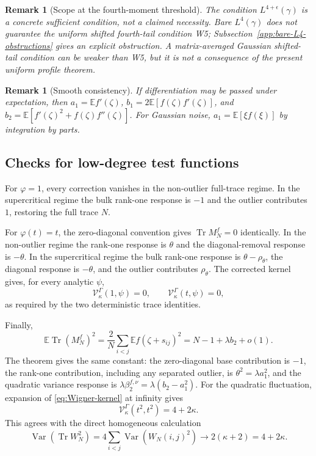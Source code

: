 \documentclass[10pt,a4paper]{amsart}
\newtheorem{remark}[theorem]{Remark}
\newcommand{\E}{\mathbb E}
\newcommand{\Var}{\operatorname{Var}}
\newcommand{\Tr}{\operatorname{Tr}}
\begin{document}
\begin{remark}[Scope at the fourth-moment threshold]
The condition $L^{4+\epsilon}(\gamma)$ is a concrete sufficient condition,
not a claimed necessity.  Bare $L^4(\gamma)$ does not guarantee the uniform
shifted fourth-tail condition W5; Subsection~\ref{app:bare-L4-obstructions}
gives an explicit obstruction.  A matrix-averaged Gaussian shifted-tail
condition can be weaker than W5, but it is not a consequence of the present
uniform profile theorem.
\end{remark}

\begin{remark}[Smooth consistency]
If differentiation may be passed under expectation, then
$a_1=\E f'(\zeta)$,
$b_1=2\E[f(\zeta)f'(\zeta)]$, and
$b_2=\E[f'(\zeta)^2+f(\zeta)f''(\zeta)]$.  For Gaussian noise,
$a_1=\E[\xi f(\xi)]$ by integration by parts.
\end{remark}
\subsection{Checks for low-degree test functions}

For $\varphi=1$, every correction vanishes in the non-outlier full-trace
regime.  In the supercritical regime the bulk rank-one response is $-1$ and
the outlier contributes $1$, restoring the full trace $N$.

For $\varphi(t)=t$, the zero-diagonal convention gives
$\Tr M_N^f=0$ identically.  In the non-outlier regime the rank-one response is
$\theta$ and the diagonal-removal response is $-\theta$.  In the
supercritical regime the bulk rank-one response is $\theta-\rho_\theta$, the
diagonal response is $-\theta$, and the outlier contributes $\rho_\theta$.
The corrected kernel gives, for every analytic \(\psi\),
\begin{equation}\label{eq:linear-covariance-check}
 \mathcal V_\kappa^\Gamma(1,\psi)=0,
 \qquad
 \mathcal V_\kappa^\Gamma(t,\psi)=0,
\end{equation}
as required by the two deterministic trace identities.

Finally,
\[
 \E\Tr(M_N^f)^2
 =\frac2N\sum_{i<j}\E f(\zeta+s_{ij})^2
 =N-1+\lambda b_2+o(1).
\]
The theorem gives the same constant: the zero-diagonal base contribution is
$-1$, the rank-one contribution, including any separated outlier, is
$\theta^2=\lambda a_1^2$, and the quadratic variance response is
$\lambda\beta_2^{f,\nu}=\lambda(b_2-a_1^2)$.
For the quadratic fluctuation, expansion of \eqref{eq:Wigner-kernel} at
infinity gives
\begin{equation}\label{eq:quadratic-covariance-check}
 \mathcal V_\kappa^\Gamma(t^2,t^2)=4+2\kappa.
\end{equation}
This agrees with the direct homogeneous calculation
\[
 \Var\!\left(\Tr W_N^2\right)
 =4\sum_{i<j}\Var(W_N(i,j)^2)
 \longrightarrow 2(\kappa+2)=4+2\kappa.
\]
\end{document}
